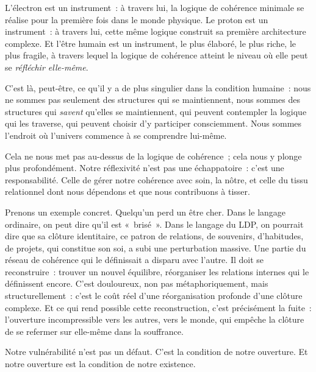 \documentclass[12pt, a4paper, openright]{book}
\begin{document}
\medskip

L'électron est un instrument~: à travers lui, la logique de cohérence minimale se réalise pour la première fois dans le monde physique. Le proton est un instrument~: à travers lui, cette même logique construit sa première architecture complexe. Et l'être humain est un instrument, le plus élaboré, le plus riche, le plus fragile, à travers lequel la logique de cohérence atteint le niveau où elle peut se \emph{réfléchir elle-même}.

\medskip

C'est là, peut-être, ce qu'il y a de plus singulier dans la condition humaine~: nous ne sommes pas seulement des structures qui se maintiennent, nous sommes des structures qui \emph{savent} qu'elles se maintiennent, qui peuvent contempler la logique qui les traverse, qui peuvent choisir d'y participer consciemment. Nous sommes l'endroit où l'univers commence à se comprendre lui-même.

\medskip

Cela ne nous met pas au-dessus de la logique de cohérence~; cela nous y plonge plus profondément. Notre réflexivité n'est pas une échappatoire~: c'est une responsabilité. Celle de gérer notre cohérence avec soin, la nôtre, et celle du tissu relationnel dont nous dépendons et que nous contribuons à tisser.

\medskip

Prenons un exemple concret. Quelqu'un perd un être cher. Dans le langage ordinaire, on peut dire qu'il est «~brisé~». Dans le langage du LDP, on pourrait dire que sa clôture identitaire, ce patron de relations, de souvenirs, d'habitudes, de projets, qui constitue son soi, a subi une perturbation massive. Une partie du réseau de cohérence qui le définissait a disparu avec l'autre. Il doit se reconstruire~: trouver un nouvel équilibre, réorganiser les relations internes qui le définissent encore. C'est douloureux, non pas métaphoriquement, mais structurellement~: c'est le coût réel d'une réorganisation profonde d'une clôture complexe. Et ce qui rend possible cette reconstruction, c'est précisément la fuite~: l'ouverture incompressible vers les autres, vers le monde, qui empêche la clôture de se refermer sur elle-même dans la souffrance.

\medskip

Notre vulnérabilité n'est pas un défaut. C'est la condition de notre ouverture. Et notre ouverture est la condition de notre existence.

\end{document}
